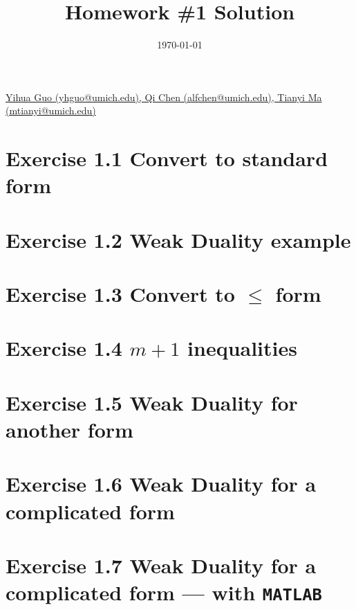 \documentclass{amsart}
\theoremstyle{definition}
\theoremstyle{remark}
\numberwithin{equation}{section}
\begin{document}
\title{Homework \#1 Solution}
	
\date{\today}

\maketitle

 \href{mailto:yhguo@umich.edu,alfchen@umich.edu,mtianyi@umich.edu}
{Yihua Guo (yhguo@umich.edu), 
Qi Chen (alfchen@umich.edu),
Tianyi Ma (mtianyi@umich.edu)}

\bigskip


\section{Exercise 1.1 Convert to standard form}



\section{Exercise 1.2 Weak Duality example}



\section{Exercise 1.3 Convert to $\leq$ form}



\section{Exercise 1.4 $m+1$ inequalities}

\section{Exercise 1.5 Weak Duality for another form}

\section{Exercise 1.6 Weak Duality for a complicated form}

\section{Exercise 1.7 Weak Duality for a complicated form --- with {\tt{MATLAB}}}


\end{document}
